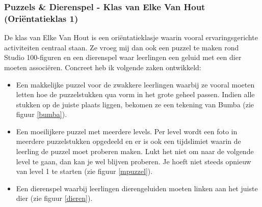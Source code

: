 \documentclass[a4paper,11pt]{article}
\theoremstyle{definition}
\begin{document}
\subsubsection{Puzzels \& Dierenspel - Klas van Elke Van Hout (Oriëntatieklas 1)}
De klas van Elke Van Hout is een oriëntatieklasje waarin vooral 
ervaringsgerichte activiteiten centraal staan. Ze vroeg mij dan ook een puzzel 
te maken rond Studio 100-figuren en een dierenspel waar leerlingen een geluid 
met een dier moeten associëren. Concreet heb ik volgende zaken ontwikkeld:

\begin{itemize}
  \item Een makkelijke puzzel voor de zwakkere leerlingen waarbij ze vooral 
  moeten letten hoe de puzzelstukken qua vorm in het grote geheel passen. Indien 
  alle stukken op de juiste plaats liggen, bekomen ze een tekening van Bumba (zie figuur 
  \ref{bumba}).
  \item Een moeilijkere puzzel met meerdere levels. Per level wordt een foto in 
  meerdere puzzelstukken opgedeeld en er is ook een tijdslimiet waarin de 
  leerling de puzzel moet proberen maken. Lukt het niet om naar de volgende 
  level te gaan, dan kan je wel blijven proberen. Je hoeft niet steeds opnieuw 
  van level 1 te starten (zie figuur \ref{mpuzzel}).
  \item Een dierenspel waarbij leerlingen dierengeluiden moeten linken aan het 
  juiste dier (zie figuur \ref{dieren}).
\end{itemize}
\end{document}
